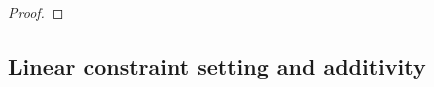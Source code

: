 \documentclass[11pt]{article}
\DeclareMathOperator{\id}{id}
\newcommand{\1}{\ensuremath{\mathbbm{1}}}
\theoremstyle{newdefinition}
\theoremstyle{newplain}
\theoremstyle{myplain}
\begin{document}
\begin{proof}
\end{proof}

\subsection{Linear constraint setting and additivity}
\end{document}

